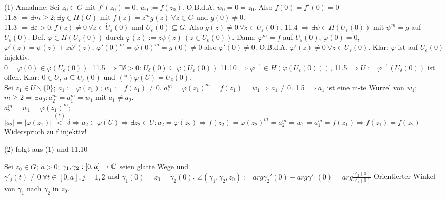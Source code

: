 \documentclass[a4paper,twoside,DIV15,BCOR12mm]{scrbook}
\begin{document}
\begin{beweis}
	\begin{liste}
		\item[ (1) ] Annahme: Sei $z_0 \in G$ mit $f'(z_0) = 0$, $w_0 := f(z_0)$. O.B.d.A. $w_0 = 0 = z_0$. Also $f(0) = f'(0) = 0$\\
			11.8 $\Rightarrow \exists m \geq 2; \exists g \in H(G)$ mit $f(z) = z^mg(z)\ \forall z \in G$ und $g(0) \neq 0$.\\
			11.3 $\Rightarrow \exists \varepsilon > 0: f(z) \neq 0\ \forall z \in \dot{U}_{\varepsilon}(0)$ und 
			$U_{\varepsilon}(0) \subseteq G$. Also $g(z) \neq 0\ \forall z \in U_{\varepsilon}(0)$. 11.4 $\Rightarrow 
			\exists \psi \in H(U_{\varepsilon}(0))$ mit $\psi^m = g$ auf $U_{\varepsilon}(0)$. Def. $\varphi \in H(U_{\varepsilon}(0))$
			durch $\varphi(z) := z\psi (z)\ (z \in U_{\varepsilon}(0))$. Dann: $\varphi^m = f$ auf $U_{\varepsilon}(0)$; $\varphi(0) = 0$, 
			$\varphi'(z) = \psi(z) + z\psi'(z)$, $\varphi'(0)^m = \psi(0)^m = g(0) \neq 0$ also $\varphi'(0) \neq 0$. 
			O.B.d.A. $\varphi'(z) \neq 0\ \forall z \in U_{\varepsilon}(0)$. Klar: $\varphi$ ist auf $U_{\varepsilon}(0)$ injektiv. \\
			$0 = \varphi(0) \in \varphi(U_{\varepsilon}(0))$. 11.5 $\Rightarrow \exists \delta > 0$: $U_{\delta}(0) \subseteq  \varphi(U_{\varepsilon}(0))$
			11.10 $\Rightarrow \varphi^{-1} \in H( \varphi(U_{\varepsilon}(0)))$, 11.5 $\Rightarrow U:=  \varphi^{-1}(U_{\delta}(0))$ ist offen.
			Klar: $0 \in U$, $u \subseteq U_{\varepsilon}(0)$ und $(*) \varphi(U) = U_{\delta}(0).$\\
			Sei $z_1 \in U\backslash\{0\}$; $a_1 := \varphi(z_1)$; $w_1 := f(z_1) \neq 0$.
			$a_1^m = \varphi(z_1)^m = f(z_1) = w_1 \Rightarrow a_1 \neq 0$.
			1.5 $\Rightarrow a_1$ ist eine m-te Wurzel von $w_1$; $m \geq 2 \Rightarrow \exists a_2: a_2^m = a_1^m = w_1$ mit $a_1 \neq a_2$. \\
			$a_2^m = w_1 = \varphi(z_1)^m$; $|a_2| = |\varphi(z_1)| \stackrel{(*)}{<} \delta \Rightarrow a_2 \in \varphi(U)
			\Rightarrow \exists z_2 \in U: a_2 =\varphi(z_2) \Rightarrow f(z_2) = \varphi(z_2)^m = a_2^m = w_1 = a_1^m = f(z_1) \Rightarrow f(z_1) = f(z_2)$
			Widerspruch zu f injektiv!
		\item[ (2) ] folgt aus (1) und 11.10
 	\end{liste}
\end{beweis}

\begin{definition}
	Sei $z_0 \in G$; $a > 0$; $\gamma_1, \gamma_2: [0,a]\rightarrow \mathbb{C}$ seien glatte Wege und \\
	$\gamma'_j(t) \neq 0\ \forall t \in [0,a], j = 1,2$ und $\gamma_1(0) = z_0 = \gamma_2(0)$.
	$\angle(\gamma_1, \gamma_2, z_0) := arg \gamma_2'(0) - arg \gamma'_1(0) = arg \frac{\gamma'_2(0)}{\gamma'_1(0)}$ 
	Orientierter Winkel von $\gamma_1$ nach $\gamma_2$ in $z_0$. 
\end{definition}
\end{document}
